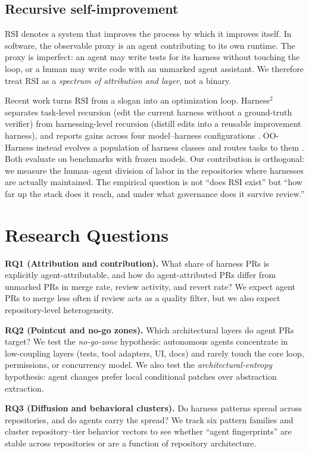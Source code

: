 \documentclass[sigconf,review]{acmart}
\begin{document}
\subsection{Recursive self-improvement}

RSI denotes a system that improves the process by which it improves itself. In software, the observable proxy is an agent contributing to its own runtime. The proxy is imperfect: an agent may write tests for its harness without touching the loop, or a human may write code with an unmarked agent assistant. We therefore treat RSI as a \emph{spectrum of attribution and layer}, not a binary.

Recent work turns RSI from a slogan into an optimization loop. Harness$^2$ separates task-level recursion (edit the current harness without a ground-truth verifier) from harnessing-level recursion (distill edits into a reusable improvement harness), and reports gains across four model--harness configurations \citep{xu2026harness2}. OO-Harness instead evolves a population of harness classes and routes tasks to them \citep{li2026ooharness}. Both evaluate on benchmarks with frozen models. Our contribution is orthogonal: we measure the human--agent division of labor in the repositories where harnesses are actually maintained. The empirical question is not ``does RSI exist'' but ``how far up the stack does it reach, and under what governance does it survive review.''

\section{Research Questions}
\label{sec:rq}

\textbf{RQ1 (Attribution and contribution).} What share of harness PRs is explicitly agent-attributable, and how do agent-attributed PRs differ from unmarked PRs in merge rate, review activity, and revert rate? We expect agent PRs to merge less often if review acts as a quality filter, but we also expect repository-level heterogeneity.

\textbf{RQ2 (Pointcut and no-go zones).} Which architectural layers do agent PRs target? We test the \emph{no-go-zone} hypothesis: autonomous agents concentrate in low-coupling layers (tests, tool adapters, UI, docs) and rarely touch the core loop, permissions, or concurrency model. We also test the \emph{architectural-entropy} hypothesis: agent changes prefer local conditional patches over abstraction extraction.

\textbf{RQ3 (Diffusion and behavioral clusters).} Do harness patterns spread across repositories, and do agents carry the spread? We track six pattern families and cluster repository--tier behavior vectors to see whether ``agent fingerprints'' are stable across repositories or are a function of repository architecture.
\end{document}
